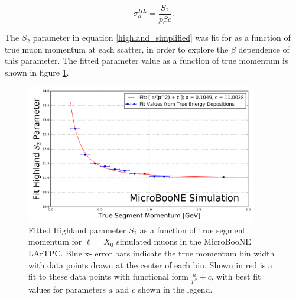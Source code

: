 \documentclass[a4paper,11pt]{article}
\begin{document}
\begin{equation}\label{highland_simplified}
	\sigma_o^{HL}=\frac{S_2}{p\beta c}.
\end{equation}

The $S_2$ parameter in equation \ref{highland_simplified} was fit for as a function of true muon momentum at each scatter, in order to explore the $\beta$ dependence of this parameter. The fitted parameter value as a function of true momentum is shown in figure \ref{retune_highland_fig1}.



\begin{figure}[ht!]
\begin{center}
\includegraphics[width=0.9\textwidth]{Figures/highland_constant_optimization_momentumdependent.png}
\end{center}
\caption{Fitted Highland parameter $S_2$ as a function of true segment momentum for ${\ell} = X_0$ simulated muons in the MicroBooNE LArTPC. Blue x- error bars indicate the true momentum bin width with data points drawn at the center of each bin. Shown in red is a fit to these data points with functional form $\frac{a}{p^2} + c$, with best fit values for parameters $a$ and $c$ shown in the legend.}
\label{retune_highland_fig1}
\end{figure}
\end{document}
